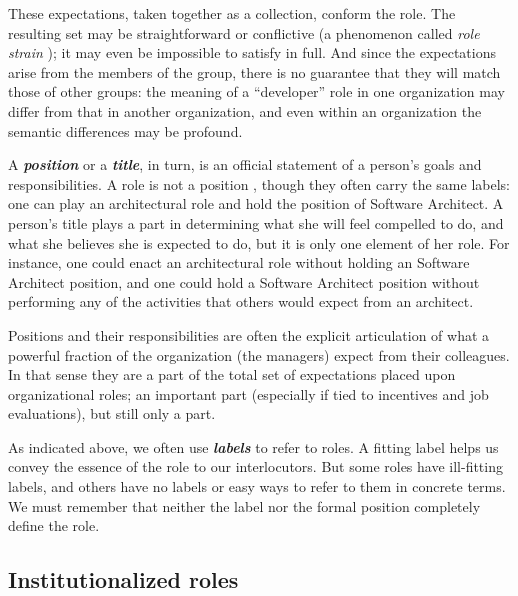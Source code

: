 \documentclass[10pt, conference, compsocconf]{IEEEtran}
\begin{document}
These expectations, taken together as a collection, conform the role. The resulting set may be straightforward or conflictive (a phenomenon called \emph{role strain} \cite{Goode1960}); it may even be impossible to satisfy in full. And since the expectations arise from the members of the group, there is no guarantee that they will match those of other groups: the meaning of a ``developer'' role in one organization may differ from that in another organization, and even within an organization the semantic differences may be profound.

A \textbf{\emph{position}} or a \textbf{\emph{title}}, in turn, is an official statement of a person's goals and responsibilities. A role is not a position \cite{Turner1956}, though they often carry the same labels: one can play an architectural role and hold the position of Software Architect. A person's title plays a part in determining what she will feel compelled to do, and what she believes she is expected to do, but it is only one element of her role. For instance, one could enact an architectural role without holding an Software Architect position, and one could hold a Software Architect position without performing any of the activities that others would expect from an architect.

Positions and their responsibilities are often the explicit articulation of what a powerful fraction of the organization (the managers) expect from their colleagues. In that sense they are a part of the total set of expectations placed upon organizational roles; an important part (especially if tied to incentives and job evaluations), but still only a part.

As indicated above, we often use \textbf{\emph{labels}} to refer to roles. A fitting label helps us convey the essence of the role to our interlocutors. But some roles have ill-fitting labels, and others have no labels or easy ways to refer to them in concrete terms. We must remember that neither the label nor the formal position completely define the role.


\subsection{Institutionalized roles}
\end{document}
